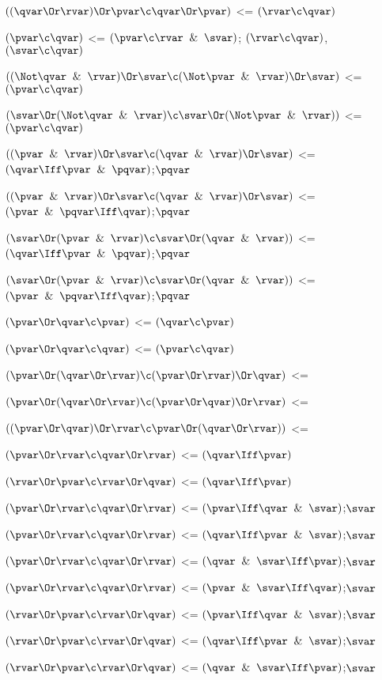 $((\qvar \Or \rvar) \Or \pvar \c \qvar \Or \pvar)$ <= $(\rvar \c \qvar)$

$(\pvar \c \qvar)$ <= $(\pvar \c \rvar \And \svar)$; $(\rvar \c \qvar)$, $(\svar \c \qvar)$

$((\Not \qvar \And \rvar) \Or  \svar\c (\Not \pvar \And \rvar)\Or\svar)$ <= $(\pvar \c \qvar)$

$(\svar \Or (\Not \qvar \And \rvar) \c \svar \Or (\Not \pvar \And \rvar))$ <= $(\pvar \c \qvar)$

$((\pvar \And \rvar) \Or  \svar\c (\qvar \And \rvar)\Or\svar)$ <= $(\qvar\Iff \pvar \And \pqvar)$;$\pqvar$

$((\pvar \And \rvar) \Or  \svar\c (\qvar \And \rvar)\Or\svar)$ <= $(\pvar \And \pqvar\Iff \qvar )$;$\pqvar$

$(\svar \Or  (\pvar \And \rvar) \c \svar\Or(\qvar \And \rvar) )$ <= $(\qvar\Iff \pvar \And \pqvar)$;$\pqvar$

$(\svar \Or  (\pvar \And \rvar) \c \svar\Or(\qvar \And \rvar) )$ <= $( \pvar \And \pqvar\Iff \qvar )$;$\pqvar$

$(\pvar \Or \qvar \c \pvar)$ <= $(\qvar \c \pvar)$

$(\pvar \Or \qvar \c \qvar)$ <= $(\pvar \c \qvar)$

$(\pvar \Or (\qvar \Or \rvar)\c (\pvar \Or \rvar) \Or \qvar)$ <=

$(\pvar \Or (\qvar \Or \rvar)\c (\pvar \Or \qvar) \Or \rvar)$ <=

$((\pvar \Or \qvar )\Or \rvar\c \pvar \Or (\qvar \Or \rvar))$ <=

$(\pvar \Or \rvar \c \qvar \Or \rvar)$ <= $(\qvar \Iff \pvar)$

$(\rvar \Or \pvar \c \rvar \Or \qvar)$ <= $(\qvar \Iff \pvar)$

$(\pvar \Or \rvar \c \qvar \Or \rvar)$ <= $(\pvar \Iff \qvar \And \svar)$;$\svar$

$(\pvar \Or \rvar \c \qvar \Or \rvar)$ <= $(\qvar \Iff \pvar \And \svar)$;$\svar$

$(\pvar \Or \rvar \c \qvar \Or \rvar)$ <= $(\qvar \And \svar\Iff \pvar)$;$\svar$

$(\pvar \Or \rvar \c \qvar \Or \rvar)$ <= $(\pvar \And \svar\Iff \qvar)$;$\svar$

$(\rvar \Or \pvar   \c \rvar \Or \qvar  )$ <= $(\pvar \Iff \qvar \And \svar)$;$\svar$

$(\rvar \Or \pvar   \c \rvar \Or \qvar  )$ <= $(\qvar \Iff \pvar \And \svar)$;$\svar$

$(\rvar \Or \pvar   \c \rvar \Or \qvar  )$ <= $(\qvar \And \svar\Iff \pvar)$;$\svar$

